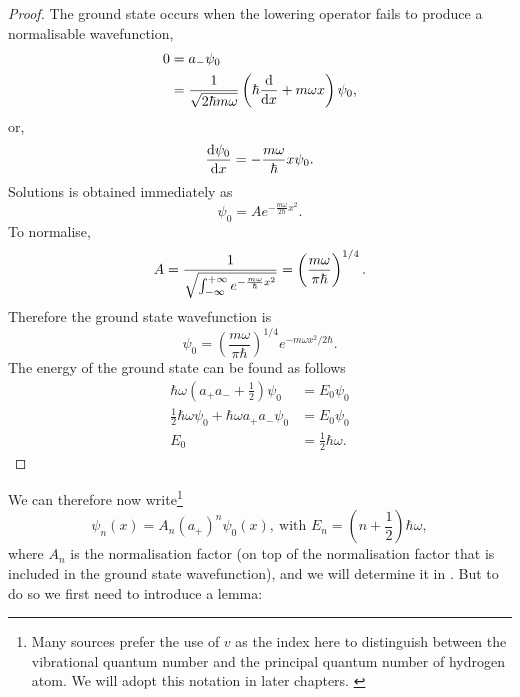 \begin{proof}
The ground state occurs when the lowering operator fails to produce a normalisable wavefunction, \ie
\begin{subequations}
\begin{align}
0&=a_-\psi_0 \\
&=\frac{1}{\sqrt{2\hbar m\omega}}\left(\hbar\diff{}{x}+m\omega x \right)\psi_0,
\end{align}
\end{subequations}
or,
\begin{equation}
\diff{\psi_0}{x}=-\frac{m\omega}{\hbar}x\psi_0.
\end{equation}
Solutions is obtained immediately as
\begin{equation}
\psi_0=Ae^{-\frac{m\omega}{2\hbar}x^2}.
\end{equation}
To normalise, 
\begin{equation}
A=\frac{1}{\sqrt{\int^{+\infty}_{-\infty} e^{-\frac{m\omega}{\hbar}x^2}}}=\left(\frac{m\omega}{\pi\hbar} \right)^{1/4}.
\end{equation}
Therefore the ground state wavefunction is 
\begin{equation}
\psi_0=\left(\frac{m\omega}{\pi\hbar} \right)^{1/4}e^{-m\omega x^2/2\hbar}.
\end{equation}
The energy of the ground state can be found as follows
\begin{subequations}
\begin{align}
\hbar\omega\left(a_+a_-+\frac{1}{2}\right)\psi_0&=E_0\psi_0\\
\frac{1}{2}\hbar\omega\psi_0+\hbar\omega a_+a_-\psi_0&=E_0\psi_0\\
E_0&=\frac{1}{2}\hbar\omega.
\end{align}
\end{subequations}
\end{proof}
We can therefore now write\footnote{Many sources prefer the use of $v$ as the index here to distinguish between the vibrational quantum number and the principal quantum number of hydrogen atom. We will adopt this notation in later chapters. \label{vibindex}}
\begin{equation}
\label{quad_gensol}
\psi_n(x)=A_n(a_+)^n\psi_0(x),\ \text{with }E_n=\left(n+\frac{1}{2}\right)\hbar\omega,
\end{equation}
where $A_n$ is the normalisation factor (on top of the normalisation factor that is included in the ground state wavefunction), and we will determine it in . But to do so we first need to introduce a lemma:

